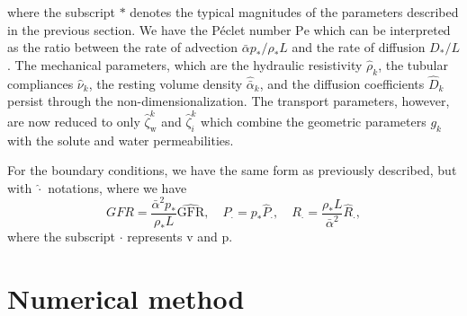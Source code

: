 \documentclass{article}
\begin{document}
    where the subscript $*$ denotes the typical magnitudes of the parameters described in the previous section.
We have the P\'eclet number $\mathrm{Pe}$ which can be interpreted as the ratio between the rate of advection $\bar{\alpha}p_*/\rho_*L$ and the rate of diffusion $D_*/L$.
The mechanical parameters, which are the hydraulic resistivity $\hat{\rho}_k$, the tubular compliances $\hat{\nu}_k$, the resting volume density $\hat{\bar{\alpha}}_k$, and the diffusion coefficients $\hat{D}_k$ persist through the non-dimensionalization.
The transport parameters, however, are now reduced to only $\hat{\zeta}_\mathrm{w}^k$ and $\hat{\zeta}_i^k$ which combine the geometric parameters $g_k$ with the solute and water permeabilities.

For the boundary conditions, we have the same form as previously described, but with $\hat{\cdot}$ notations, where we have
\begin{equation}
    GFR = \frac{\bar{\alpha}^2 p_*}{\rho_* L}\widehat{\mathrm{GFR}},\quad
    P_\cdot = p_*\hat{P}_\cdot,\quad R_\cdot = \frac{\rho_* L}{\bar{\alpha}^2}\hat{R}_\cdot,
\end{equation}
    where the subscript $\cdot$ represents $\mathrm{v}$ and $\mathrm{p}$.

\section{Numerical method}

\end{document}
